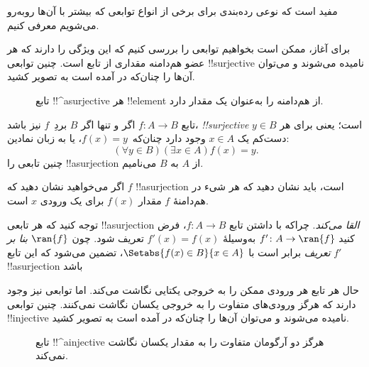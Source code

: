 \documentclass[../../../include/open-logic-section]{subfiles}
\begin{document}

\begin{explain}
مفید است که نوعی رده‌بندی برای برخی از
انواع توابعی که بیشتر با آن‌ها روبه‌رو می‌شویم معرفی کنیم.

برای آغاز، ممکن است بخواهیم توابعی را بررسی کنیم که این ویژگی را دارند
که هر عضو هم‌دامنه مقداری از تابع است. چنین
توابعی !!{surjective} نامیده می‌شوند و می‌توان آن‌ها را چنان‌که در
 آمده است به تصویر کشید.

\begin{figure}
  \caption{تابع !!^a{surjective} هر !!{element} از
    هم‌دامنه را به‌عنوان یک مقدار دارد.}
\end{figure}
\end{explain}

\begin{defn}
تابع $f \colon A \rightarrow B$ اگر و تنها اگر $B$
بردِ~$f$ نیز باشد، \emph{!!{surjective}} است؛ یعنی برای هر $y \in B$ دست‌کم
یک $x \in A$ وجود دارد چنان‌که~$f(x) = y$، یا به زبان نمادین:
\[
  (\forall y \in B)(\exists x \in A)f(x) = y.
\]
چنین تابعی را !!a{surjection} از $A$ به $B$ می‌نامیم.
\end{defn}

\begin{explain}
اگر می‌خواهید نشان دهید که $f$ !!a{surjection} است، باید نشان دهید
که هر شیء در هم‌دامنهٔ $f$ مقدار $f(x)$ برای یک
ورودی $x$ است.

توجه کنید که هر تابعی !!a{surjection} \emph{القا می‌کند}. چراکه
با داشتن تابع $f \colon A \to B$، فرض کنید $f' \colon A \to \ran{f}$ به‌وسیلهٔ
$f'(x) = f(x)$ تعریف شود. چون $\ran{f}$ \emph{بنا بر تعریف} برابر است با
$\Setabs{f(x) \in B}{x \in A}$، تضمین می‌شود که این تابع $f'$
!!a{surjection} باشد
\end{explain}

\begin{explain}
حال هر تابع هر ورودی ممکن را به خروجی یکتایی نگاشت می‌کند. اما
توابعی نیز وجود دارند که هرگز ورودی‌های متفاوت را به
خروجی یکسان نگاشت نمی‌کنند. چنین توابعی !!{injective} نامیده می‌شوند و می‌توان آن‌ها را
چنان‌که در  آمده است به تصویر کشید.
\begin{figure}
  \caption{تابع !!^a{injective} هرگز دو
    آرگومان متفاوت را به مقدار یکسان نگاشت نمی‌کند.}
\end{figure}
\end{explain}
\end{document}
